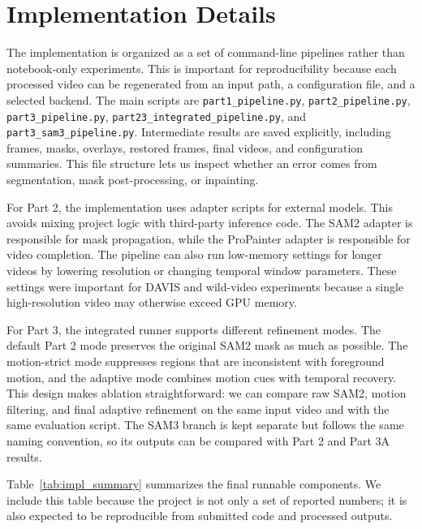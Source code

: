 \documentclass[10pt,twocolumn,letterpaper]{article}
\begin{document}
\section{Implementation Details}
The implementation is organized as a set of command-line pipelines rather than notebook-only experiments. This is important for reproducibility because each processed video can be regenerated from an input path, a configuration file, and a selected backend. The main scripts are \texttt{part1\_pipeline.py}, \texttt{part2\_pipeline.py}, \texttt{part3\_pipeline.py}, \texttt{part23\_integrated\_pipeline.py}, and \texttt{part3\_sam3\_pipeline.py}. Intermediate results are saved explicitly, including frames, masks, overlays, restored frames, final videos, and configuration summaries. This file structure lets us inspect whether an error comes from segmentation, mask post-processing, or inpainting.

For Part 2, the implementation uses adapter scripts for external models. This avoids mixing project logic with third-party inference code. The SAM2 adapter is responsible for mask propagation, while the ProPainter adapter is responsible for video completion. The pipeline can also run low-memory settings for longer videos by lowering resolution or changing temporal window parameters. These settings were important for DAVIS and wild-video experiments because a single high-resolution video may otherwise exceed GPU memory.

For Part 3, the integrated runner supports different refinement modes. The default Part 2 mode preserves the original SAM2 mask as much as possible. The motion-strict mode suppresses regions that are inconsistent with foreground motion, and the adaptive mode combines motion cues with temporal recovery. This design makes ablation straightforward: we can compare raw SAM2, motion filtering, and final adaptive refinement on the same input video and with the same evaluation script. The SAM3 branch is kept separate but follows the same naming convention, so its outputs can be compared with Part 2 and Part 3A results.

Table~\ref{tab:impl_summary} summarizes the final runnable components. We include this table because the project is not only a set of reported numbers; it is also expected to be reproducible from submitted code and processed outputs.
\end{document}
